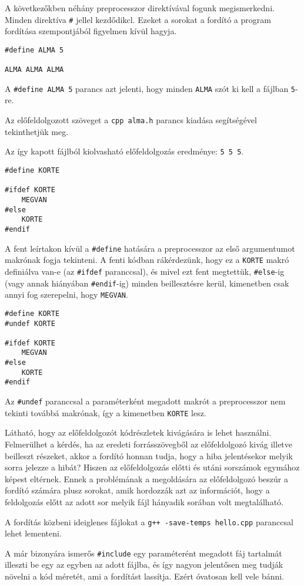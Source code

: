 \documentclass[a4paper,11.5pt,table]{article}
\begin{document}
	A következőkben néhány preprocesszor direktívával fogunk megismerkedni. Minden direktíva \texttt{\#} jellel kezdődikcl. Ezeket a sorokat a fordító a program fordítása szempontjából figyelmen kívül hagyja.
  \bigskip
	
	\begin{lstlisting}
#define ALMA 5

ALMA ALMA ALMA
	\end{lstlisting}
	A \texttt{\#define ALMA 5}  parancs azt jelenti, hogy minden \texttt{ALMA} szót ki kell a fájlban \texttt{5}-re.
	
	Az előfeldolgozott szöveget a \texttt{cpp alma.h} parancs kiadása segítségével tekinthetjük meg.
	
	Az így kapott fájlból kiolvasható előfeldolgozás eredménye: \texttt{5 5 5}.
	\bigskip
	
	\begin{lstlisting}
#define KORTE

#ifdef KORTE
	MEGVAN
#else
	KORTE
#endif
	\end{lstlisting}
	A fent leírtakon kívül a \texttt{\#define} hatására a preprocesszor az első argumentumot makrónak fogja tekinteni. A fenti kódban rákérdezünk, hogy ez a \texttt{KORTE} makró definiálva van-e (az \texttt{\#ifdef} paranccsal), és mivel ezt fent megtettük, \texttt{\#else}-ig (vagy annak hiányában \texttt{\#endif}-ig) minden beillesztésre kerül, kimenetben csak annyi fog szerepelni, hogy \texttt{MEGVAN}.
	\bigskip
	
	\begin{lstlisting}
#define KORTE
#undef KORTE

#ifdef KORTE
	MEGVAN
#else
	KORTE
#endif
	\end{lstlisting}
	Az \texttt{\#undef} paranccsal a paraméterként megadott makrót a preprocesszor nem tekinti továbbá makrónak, így a kimenetben \texttt{KORTE} lesz.
	
	Látható, hogy az előfeldolgozót kódrészletek kivágására is lehet használni. 
  Felmerülhet a kérdés, ha az eredeti forrásszövegből az előfeldolgozó kivág illetve beilleszt részeket, akkor a fordító honnan tudja, hogy a hiba jelentésekor melyik sorra jelezze a hibát? Hiszen az előfeldolgozás előtti és utáni sorszámok egymához képest eltérnek. Ennek a problémának a megoldására az előfeldolgozó beszúr a fordító számára plusz sorokat, amik hordozzák azt az információt, hogy a feldolgozás előtt az adott sor melyik fájl hányadik sorában volt megtalálható. 
	\begin{note}
		 A fordítás közbeni ideiglenes fájlokat a \texttt{g++ -save-temps hello.cpp} paranccsal lehet lementeni.
	\end{note}
	A már bizonyára ismerős \texttt{\#include} egy paraméterént megadott fáj tartalmát illeszti be egy az egyben az adott fájlba, és így nagyon jelentősen meg tudják növelni a kód méretét, ami a fordítást lassítja. Ezért óvatosan kell vele bánni.
	\bigskip
	
\end{document}
